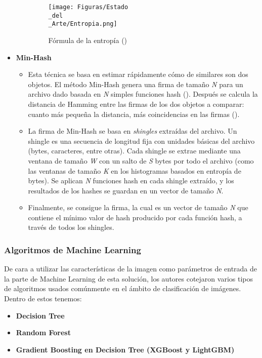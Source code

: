 \begin{itemize}
\begin{itemize}
\begin{figure}[H]
  \centering
  \texttt{[image: Figuras/Estado\\\_del\\\_Arte/Entropia.png]}
  \label{fig:entropia}
  \caption{Fórmula de la entropía (\cite{entropia})}
\end{figure}

\end{itemize}
\item \textbf{Min-Hash}
\begin{itemize}
\item Esta técnica se basa en estimar rápidamente cómo de similares son dos objetos. El método Min-Hash genera una firma de tamaño \textit{N} para un archivo dado basada en \textit{N} simples funciones hash (\cite{min-hash}). Después se calcula la distancia de Hamming entre las firmas de los dos objetos a comparar: cuanto más pequeña la distancia, más coincidencias en las firmas (\cite{hamming}). %
\item La firma de Min-Hash se basa en \textit{shingles} extraídas del archivo. Un shingle es una secuencia de longitud fija con unidades básicas del archivo (bytes, caracteres, entre otras). Cada shingle se extrae mediante una ventana de tamaño \textit{W} con un salto de \textit{S} bytes por todo el archivo (como las ventanas de tamaño \textit{K} en los histogramas basados en entropía de bytes). Se aplican \textit{N} funciones hash en cada shingle extraído, y los resultados de los hashes se guardan en un vector de tamaño \textit{N}.
\item Finalmente, se consigue la firma, la cual es un vector de tamaño \textit{N} que contiene el mínimo valor de hash producido por cada función hash, a través de todos los shingles.
\end{itemize}
\end{itemize}

\subsubsection{Algoritmos de Machine Learning}

De cara a utilizar las características de la imagen como parámetros de entrada de la parte de Machine Learning de esta solución, los autores cotejaron varios tipos de algoritmos usados comúnmente en el ámbito de clasificación de imágenes. Dentro de estos tenemos:

\begin{itemize}
\item \textbf{Decision Tree}
\item \textbf{Random Forest}
\item \textbf{Gradient Boosting en Decision Tree (XGBoost y LightGBM)}
\end{itemize}

